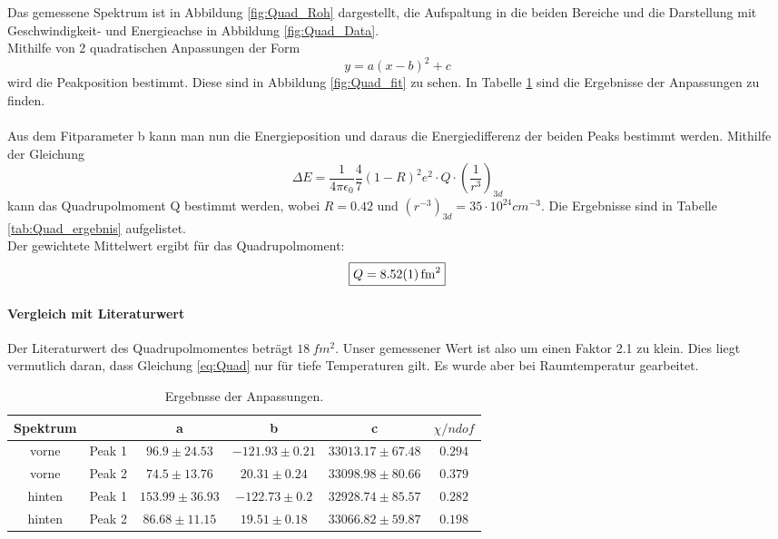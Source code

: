 \documentclass[12pt,a4paper]{article}
\begin{document}
Das gemessene Spektrum ist in Abbildung \ref{fig:Quad_Roh} dargestellt, die Aufspaltung in die beiden Bereiche und die Darstellung mit Geschwindigkeit- und Energieachse in Abbildung \ref{fig:Quad_Data}.\\
Mithilfe von 2 quadratischen Anpassungen der Form
\begin{equation}
y = a(x-b)^2+c
\end{equation}
wird die Peakposition bestimmt. Diese sind in Abbildung \ref{fig:Quad_fit} zu sehen. In Tabelle \ref{tab:Quad_vor} sind die Ergebnisse der Anpassungen zu finden.\\
\\
Aus dem Fitparameter b kann man nun die Energieposition und daraus die Energiedifferenz der beiden Peaks bestimmt werden. Mithilfe der Gleichung
\begin{equation}
\Delta E = \dfrac{1}{4 \pi \epsilon_0}\dfrac{4}{7}(1-R)^2e^2\cdot Q \cdot \left(\dfrac{1}{r^3}\right)_{3d}
\label{eq:Quad}
\end{equation}
kann das Quadrupolmoment Q bestimmt werden, wobei $R = 0.42$ und $(r^{-3})_{3d} = 35\cdot 10^{24} cm^{-3}$. Die Ergebnisse sind in Tabelle \ref{tab:Quad_ergebnis} aufgelistet.\\
Der gewichtete Mittelwert ergibt für das Quadrupolmoment:
\begin{equation*}
\boxed{Q = \SI{8.52\pm 0.01}{fm^2}}
\end{equation*}

\paragraph{Vergleich mit Literaturwert}
Der Literaturwert des Quadrupolmomentes beträgt $\SI{18}{fm^2}$. Unser gemessener Wert ist also um einen Faktor 2.1 zu klein. Dies liegt vermutlich daran, dass Gleichung \ref{eq:Quad} nur für tiefe Temperaturen gilt. Es wurde aber bei Raumtemperatur gearbeitet.


\begin{table}
\centering
\begin{tabular}{|c|c|c|c|c|c|}
\hline
Spektrum &  & a & b & c & $\chi / ndof$\\
\hline
vorne & Peak 1 & $ 96.9 \pm 24.53 $ & $ -121.93 \pm 0.21 $ & $ 33013.17 \pm 67.48 $ & $ 0.294 $\\
\hline
vorne & Peak 2& $ 74.5 \pm 13.76 $ & $ 20.31 \pm 0.24 $ & $ 33098.98 \pm 80.66 $ & $ 0.379 $\\
\hline
\hline
hinten & Peak 1& $ 153.99 \pm 36.93 $ & $ -122.73 \pm 0.2 $ & $ 32928.74 \pm 85.57 $ & $ 0.282 $\\
\hline
hinten & Peak 2& $ 86.68 \pm 11.15 $ & $ 19.51 \pm 0.18 $ & $ 33066.82 \pm 59.87 $ & $ 0.198 $\\
\hline
\end{tabular}
\caption{Ergebnsse der Anpassungen.}
\label{tab:Quad_vor}
\end{table}
\end{document}
